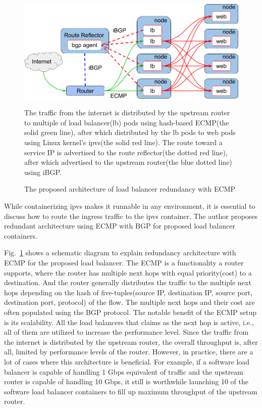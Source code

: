 \begin{figure}[tb]
  \centering
  \includegraphics[width=0.8\columnwidth]{Figs/ecmp.png}
\caption{The proposed architecture of load balancer redundancy with ECMP}

\vspace{1mm}

\begin{minipage}{0.9\columnwidth}
   The traffic from the internet is distributed by the upstream router to multiple of load balancer(lb) pods using hash-based ECMP(the solid green line), after which distributed by the lb pods to web pods using Linux kernel's ipvs(the solid red line).
  The route toward a service IP is advertised to the route reflector(the dotted red line), after which advertised to the upstream router(the blue dotted line) using iBGP.
\end{minipage}

\label{fig:ecmp}
\end{figure}

While containerizing ipvs makes it runnable in any environment, it is essential to discuss how to route the ingress traffic to the ipvs container.
The author proposes redundant architecture using ECMP with BGP for proposed load balancer containers.

Fig.~\ref{fig:ecmp} shows a schematic diagram to explain redundancy architecture with ECMP for the proposed load balancer.
%
The ECMP is a functionality a router supports, where the router has multiple next hops with equal priority(cost) to a destination.
And the router generally distributes the traffic to the multiple next hops depending on the hash of five-tuples(source IP, destination IP, source port, destination port, protocol) of the flow.
The multiple next hops and their cost are often populated using the BGP protocol.
%
The notable benefit of the ECMP setup is its scalability.
All the load balancers that claims as the next hop is active, i.e., all of them are utilized to increase the performance level.
Since the traffic from the internet is distributed by the upstream router, the overall throughput is, after all, limited by performance levels of the router.
However, in practice, there are a lot of cases where this architecture is beneficial.
For example, if a software load balancer is capable of handling 1 Gbps equivalent of traffic and the upstream router is capable of handling 10 Gbps, it still is worthwhile launching 10 of the software load balancer containers to fill up maximum throughput of the upstream router.

